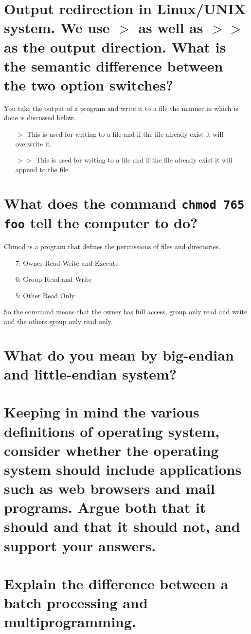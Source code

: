 \documentclass{article}
\begin{document}
\section{Output redirection in Linux/UNIX system. We use \(>\) as well as \(>>\) as the output direction. What is the semantic difference between the two option switches?}
You take the output of a program and write it to a file the manner in which is done is discussed below.
\begin{itemize}
	\item [\(>\)] This is used for writing to a file and if the file already exist it will overwrite it.
	\item [\(>>\)] This is used for writing to a file and if the file already exist it will append to the file.
\end{itemize}
\section{What does the command \texttt{chmod 765 foo} tell the computer to do?}
Chmod is a program that defines the permissions of files and directories. 
\begin{itemize}
	\item [7: Owner] Read Write and Execute
	\item [6: Group] Read and Write
	\item [5: Other] Read Only
\end{itemize}
So the command means that the owner has full access, group only read and write and the others group only read only.
\section{What do you mean by big-endian and little-endian system?}

\section{Keeping in mind the various definitions of \textbf{operating system}, consider whether the operating system should include applications such as web browsers and mail programs. Argue both that it should and that it should not, and support your answers.}

\section{Explain the difference between a batch processing and multiprogramming.}
\end{document}
